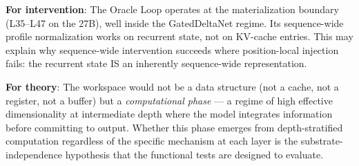 \textbf{For intervention}: The Oracle Loop operates at the
materialization boundary (L35--L47 on the 27B), well inside the
GatedDeltaNet regime. Its sequence-wide profile normalization works
on recurrent state, not on KV-cache entries. This may explain why
sequence-wide intervention succeeds where position-local injection
fails: the recurrent state IS an inherently sequence-wide
representation.

\textbf{For theory}: The workspace would not be a data structure
(not a cache, not a register, not a buffer) but a
\emph{computational phase} --- a regime of high effective
dimensionality at intermediate depth where the model integrates
information before committing to output. Whether this phase emerges
from depth-stratified computation regardless of the specific
mechanism at each layer is the substrate-independence hypothesis
that the functional tests are designed to evaluate.
